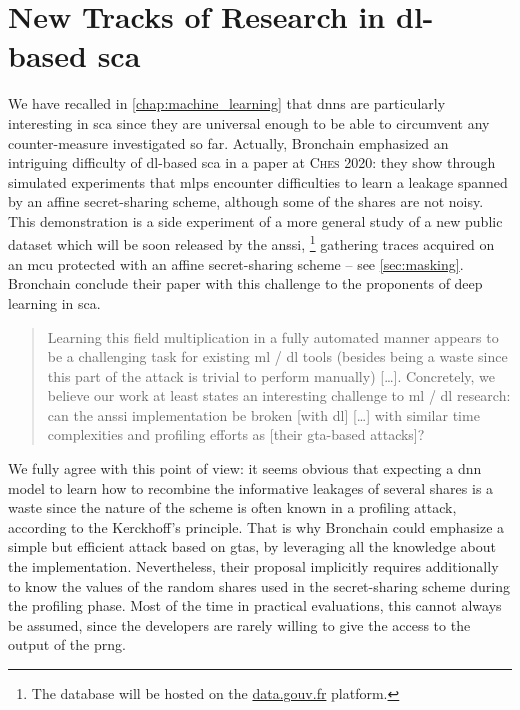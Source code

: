 \section{New Tracks of Research in \texorpdfstring{\gls{dl}}{DL}-based \texorpdfstring{\gls{sca}}{SCA}}
	We have recalled in \autoref{chap:machine_learning} that \glspl{dnn} are particularly interesting in \gls{sca} since they are universal enough to be able to circumvent any counter-measure investigated so far.
	Actually, Bronchain \etal{} emphasized an intriguing difficulty of \gls{dl}-based \gls{sca} in a paper at \textsc{Ches} 2020: they show through simulated experiments that \glspl{mlp} encounter difficulties to learn a leakage spanned by an affine secret-sharing scheme, although some of the shares are not noisy.
	This demonstration is a side experiment of a more general study of a new public dataset which will be soon released by the \gls{anssi},%
	\footnote{
		The database will be hosted on the \url{data.gouv.fr} platform.
	}
	gathering traces acquired on an \gls{mcu} protected with an affine secret-sharing scheme -- see \autoref{sec:masking}.
	Bronchain \etal{} conclude their paper with this challenge to the proponents of deep learning in \gls{sca}.
	\begin{quotation}
		Learning this field multiplication in a fully automated manner appears to be a challenging task for existing \gls{ml} / \gls{dl} tools (besides being a waste since this part of the attack is trivial to perform manually) [\ldots].
		Concretely, we believe our work at least states an interesting challenge to \gls{ml} / \gls{dl} research: can the \gls{anssi} implementation be broken [with \gls{dl}] [\ldots] with similar time complexities and profiling efforts as [their \gls{gta}-based attacks]?~\cite{bronchain_dissection_2020}
	\end{quotation}
	We fully agree with this point of view: it seems obvious that expecting a \gls{dnn} model to learn how to recombine the informative leakages of several shares is a waste since the nature of the scheme is often known in a profiling attack, according to the Kerckhoff's principle.
	That is why Bronchain \etal{} could emphasize a simple but efficient attack based on \glspl{gta}, by leveraging all the knowledge about the implementation.
	Nevertheless, their proposal implicitly requires additionally to know the values of the random shares used in the secret-sharing scheme during the profiling phase.
	Most of the time in practical evaluations, this cannot always be assumed, since the developers are rarely willing to give the access to the output of the \gls{prng}.
